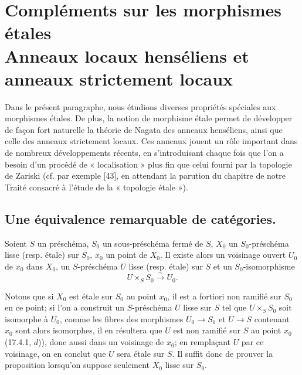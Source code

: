 \section[Compléments sur les morphismes étales. Anneaux locaux henséliens et anneaux strictement locaux]{Compléments sur les morphismes étales\\Anneaux locaux henséliens et anneaux strictement locaux}
\label{section:IV.18}

Dans le présent paragraphe, nous étudions diverses propriétés spéciales aux morphismes étales. De plus, la notion de morphisme étale permet de développer de façon fort naturelle la théorie de Nagata des anneaux henséliens, ainsi que celle des anneaux strictement locaux. Ces anneaux jouent un rôle important dans de nombreux développements récents, en s'introduisant chaque fois que l'on a besoin d'un procédé de « localisation » plus fin que celui fourni par la topologie de Zariski (cf. par exemple [43], en attendant la parution du chapitre de notre Traité consacré à l'étude de la « topologie étale »).

\subsection{Une équivalence remarquable de catégories.}

\begin{proposition}[18.1.1]
\label{IV.18.1.1}
Soient $S$ un préschéma, $S_0$ un sous-préschéma fermé de $S$, $X_0$ un $S_0$-préschéma lisse (resp. étale) sur $S_0$, $x_0$ un point de $X_0$. Il existe alors un voisinage ouvert $U_0$ de $x_0$ dans $X_0$, un $S$-préschéma $U$ lisse (resp. étale) sur $S$ et un $S_0$-isomorphisme
\[
  U\times_S S_0\xrightarrow{\sim}U_0.
\]
\end{proposition}

Notons que si $X_0$ est étale sur $S_0$ au point $x_0$, il est a fortiori non ramifié sur $S_0$ en ce point; si l'on a construit un $S$-préschéma $U$ lisse sur $S$ tel que $U\times_S S_0$ soit isomorphe à $U_0$, comme les fibres des morphismes $U_0\to S_0$ et $U\to S$ contenant $x_0$ sont alors isomorphes, il en résultera que $U$ est non ramifié sur $S$ au point $x_0$ (17.4.1, $d$)), donc aussi dans un voisinage de $x_0$; en remplaçant $U$ par ce voisinage, on en conclut que $U$ sera étale sur $S$. Il suffit donc de prouver la proposition lorsqu'on suppose seulement $X_0$ lisse sur $S_0$.

